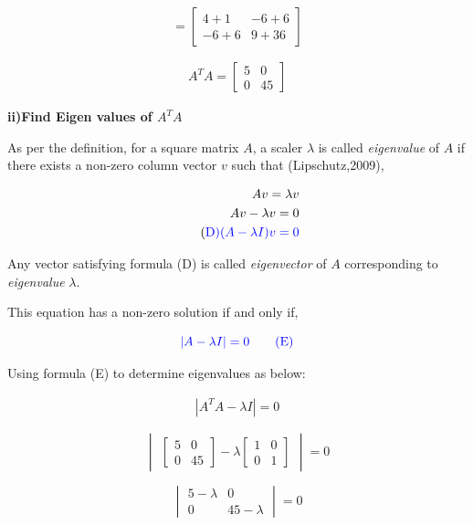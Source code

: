 \documentclass[a4paper]{report}
\begin{document}
\[=\begin{bmatrix}
    4+1&-6+6\\-6+6&9+36
\end{bmatrix}\]

\begin{align}
A^TA = \begin{bmatrix}
    5&0\\0&45
\end{bmatrix}
\end{align}


\textbf{ii)Find Eigen values of $A^TA$ }

As per the definition, for a square matrix $A$, a scaler $\lambda$ is called \textit{eigenvalue} of $A$ if there exists a non-zero column vector $v$ such that (Lipschutz,2009),

\begin{align*}
    Av=\lambda v \\
    Av-\lambda v=0 \\ \tag{\color{blue}D}
    \color{blue} (A-\lambda I)v=0
\end{align*}

Any vector satisfying formula (D) is called \textit{eigenvector} of $A$ corresponding to \textit{eigenvalue} $\lambda$. 

 This equation has a non-zero solution if and only if,

\begin{equation}
    \color{blue} |A-\lambda I|=0 \tag{E}
\end{equation}

Using formula (E) to determine eigenvalues as below: 

\begin{align*}
    |A^TA-\lambda I|=0 
\end{align*}


\[\begin{vmatrix}
    \begin{bmatrix}
    5&0\\0&45
\end{bmatrix} - \lambda \begin{bmatrix}
    1&0\\0&1
\end{bmatrix} \end{vmatrix} = 0\]

\[\begin{vmatrix}
    5-\lambda&0\\0&45-\lambda
\end{vmatrix}=0\]
\end{document}

